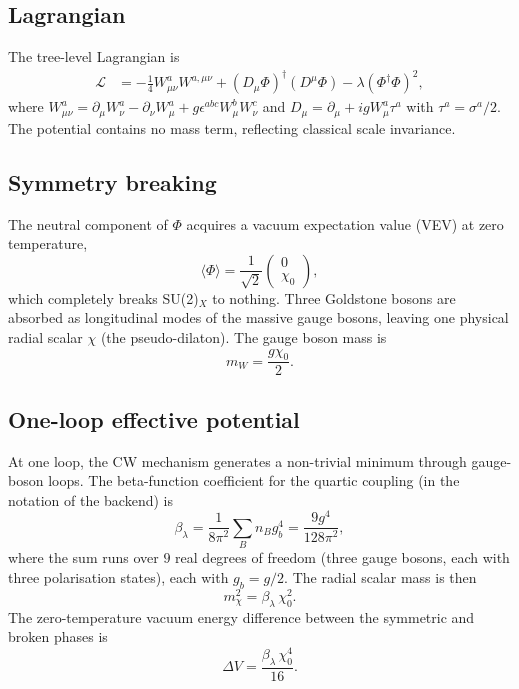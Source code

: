 \documentclass[12pt,a4paper]{article}
\begin{document}
\subsection{Lagrangian}

The tree-level Lagrangian is
\begin{align}
\mathcal{L} &= -\frac14 W_{\mu\nu}^a W^{a,\mu\nu}
+ (D_\mu \Phi)^\dagger (D^\mu \Phi)
- \lambda (\Phi^\dagger \Phi)^2,
\end{align}
where $W_{\mu\nu}^a = \partial_\mu W_\nu^a - \partial_\nu W_\mu^a + g \epsilon^{abc} W_\mu^b W_\nu^c$ and $D_\mu = \partial_\mu + i g W_\mu^a \tau^a$ with $\tau^a = \sigma^a/2$. The potential contains no mass term, reflecting classical scale invariance.

\subsection{Symmetry breaking}

The neutral component of $\Phi$ acquires a vacuum expectation value (VEV) at zero temperature,
\begin{equation}
\langle \Phi \rangle = \frac{1}{\sqrt{2}} \begin{pmatrix} 0 \\ \chi_0 \end{pmatrix},
\end{equation}
which completely breaks SU(2)$_X$ to nothing. Three Goldstone bosons are absorbed as longitudinal modes of the massive gauge bosons, leaving one physical radial scalar $\chi$ (the pseudo-dilaton). The gauge boson mass is
\begin{equation}
m_W = \frac{g\chi_0}{2}.
\end{equation}

\subsection{One-loop effective potential}

At one loop, the CW mechanism generates a non-trivial minimum through gauge-boson loops. The beta-function coefficient for the quartic coupling (in the notation of the backend) is
\begin{equation}
\beta_\lambda = \frac{1}{8\pi^2} \sum_B n_B g_b^4
= \frac{9g^4}{128\pi^2},
\end{equation}
where the sum runs over $9$ real degrees of freedom (three gauge bosons, each with three polarisation states), each with $g_b = g/2$. The radial scalar mass is then
\begin{equation}
m_\chi^2 = \beta_\lambda \,\chi_0^2.
\end{equation}
The zero-temperature vacuum energy difference between the symmetric and broken phases is
\begin{equation}
\Delta V = \frac{\beta_\lambda \,\chi_0^4}{16}.
\end{equation}
\end{document}
